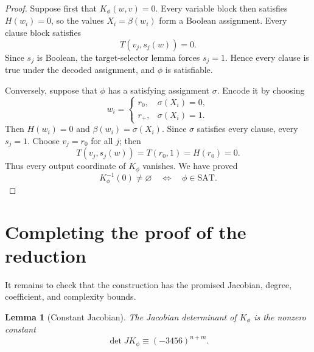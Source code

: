 \documentclass[11pt]{article}
\newtheorem{lemma}[theorem]{Lemma}
\begin{document}
\begin{proof}
Suppose first that $K_\phi(w,v)=0$.  Every variable block then satisfies
$H(w_i)=0$, so the values $X_i=\beta(w_i)$ form a Boolean assignment.  Every
clause block satisfies
\[
T(v_j,s_j(w))=0.
\]
Since $s_j$ is Boolean, the target-selector lemma forces $s_j=1$.  Hence every
clause is true under the decoded assignment, and $\phi$ is satisfiable.

Conversely, suppose that $\phi$ has a satisfying assignment $\sigma$.  Encode
it by choosing
\[
w_i=
\begin{cases}
r_0,&\sigma(X_i)=0,\\
r_+,&\sigma(X_i)=1.
\end{cases}
\]
Then $H(w_i)=0$ and $\beta(w_i)=\sigma(X_i)$.  Since $\sigma$ satisfies every
clause, every $s_j=1$.  Choose $v_j=r_0$ for all $j$; then
\[
T(v_j,s_j(w))=T(r_0,1)=H(r_0)=0.
\]
Thus every output coordinate of $K_\phi$ vanishes.  We have proved
\[
K_\phi^{-1}(0)\neq\varnothing
\quad\Longleftrightarrow\quad
\phi\in\mathrm{SAT}.
\]
\end{proof}

\section{Completing the proof of the reduction}

It remains to check that the construction has the promised Jacobian,
degree, coefficient, and complexity bounds.

\begin{lemma}[Constant Jacobian]
The Jacobian determinant of $K_\phi$ is the nonzero constant
\[
\det JK_\phi\equiv(-3456)^{n+m}.
\]
\end{lemma}
\end{document}

